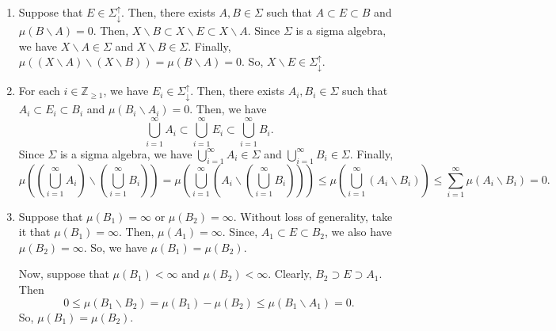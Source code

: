 \documentclass{article}
\newcommand{\Z}{\mathbb{Z}}
\begin{document}
\begin{enumerate}[label=(\roman*)]
    \item Suppose that $E \in \Sigma^{\uparrow}_{\downarrow}$. Then, there exists $A,B\in \Sigma$ such 
    that $A \subset E \subset B$ and $\mu(B \backslash A) = 0$. Then, $X \backslash B \subset X \backslash E 
    \subset X \backslash A$. Since $\Sigma$ is a sigma algebra, we have $X \backslash A \in\Sigma$ and 
    $X \backslash B \in \Sigma$. 
    Finally, $\mu((X \backslash A)\backslash(X \backslash B)) = \mu(B\backslash A) = 0$. 
    So, $X \backslash E \in \Sigma^{\uparrow}_{\downarrow}$. 

    \item For each $i\in\Z_{\geq 1}$, we have $E_i \in \Sigma^{\uparrow}_{\downarrow}$. 
    Then, there exists $A_i,B_i\in \Sigma$ such that $A_i \subset E_i \subset B_i$ and 
    $\mu(B_i \backslash A_i) = 0$. Then, we have 
    $$ \bigcup_{i=1}^\infty A_i \subset \bigcup_{i=1}^\infty E_i \subset \bigcup_{i=1}^\infty B_i.$$ 
    Since $\Sigma$ is a sigma algebra, we have $\bigcup_{i=1}^\infty A_i \in\Sigma$ and 
    $\bigcup_{i=1}^\infty B_i \in \Sigma$. 
    Finally, 
    \begin{equation}
        \mu\left( 
            \left(\bigcup_{i=1}^\infty A_i \right) \backslash \left( \bigcup_{i=1}^\infty B_i \right) 
        \right) 
        = \mu\left( 
            \bigcup_{i=1}^\infty \left( A_i \backslash \left( \bigcup_{i=1}^\infty B_i \right) \right) 
        \right)
        \leq \mu\left( 
            \bigcup_{i=1}^\infty \left( A_i \backslash B_i \right) 
        \right)
        \leq \sum_{i=1}^\infty \mu\left(  A_i \backslash B_i \right) = 0. 
    \end{equation}

    \item Suppose that $\mu(B_1)=\infty$ or $\mu(B_2)=\infty$. Without loss of generality, take it that 
    $\mu(B_1) = \infty$. Then, $\mu(A_1) = \infty$. Since, $A_1 \subset E \subset B_2$, we also have 
    $\mu(B_2) = \infty$. So, we have $\mu(B_1) = \mu(B_2)$. 

    Now, suppose that $\mu(B_1)<\infty$ and $\mu(B_2)<\infty$. 
    Clearly, $B_2 \supset E \supset A_1$. 
    Then $$0 \leq \mu(B_1\backslash B_2) = \mu(B_1)-\mu(B_2) \leq \mu(B_1\backslash A_1 ) = 0.$$
    So, $\mu(B_1) = \mu(B_2)$. 


\end{enumerate}
\end{document}
